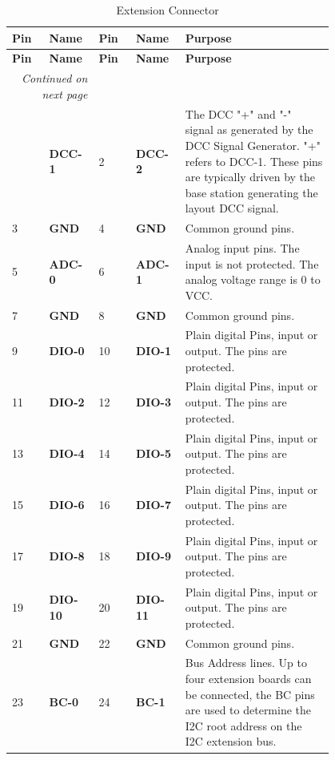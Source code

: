 \begin{longtable}{@{}|p{0.1\linewidth}|p{0.1\linewidth}|p{0.1\linewidth}|p{0.1\linewidth}|p{0.4\linewidth}|@{}}
    \caption{Extension Connector} \\
    \toprule
    \textbf{Pin} & \textbf{Name} & \textbf{Pin} & \textbf{Name} & \textbf{Purpose} \\
    \midrule
    \endfirsthead
    \toprule
    \textbf{Pin} & \textbf{Name} & \textbf{Pin} & \textbf{Name} & \textbf{Purpose} \\
    \midrule
    \endhead
    \midrule
    \multicolumn{2}{r}{\textit{Continued on next page}} \\
    \midrule
    \endfoot
    \bottomrule
    \endlastfoot
    1 & \textbf{DCC-1} & 2 & \textbf{DCC-2} & The DCC "+" and "-" signal as generated by the DCC Signal Generator. "+" refers to DCC-1. These pins are typically driven by the base station generating the layout DCC signal.\\
    \midrule
    3 & \textbf{GND} & 4 & \textbf{GND} & Common ground pins. \\
    \midrule
    5 & \textbf{ADC-0} & 6 & \textbf{ADC-1} & Analog input pins. The input is not protected. The analog voltage range is 0 to VCC. \\
    \midrule
    7 & \textbf{GND} & 8 & \textbf{GND} & Common ground pins. \\
    \midrule
    9 & \textbf{DIO-0} & 10 & \textbf{DIO-1} & Plain digital Pins, input or output. The pins are protected. \\
    \midrule
    11 & \textbf{DIO-2} & 12 & \textbf{DIO-3} & Plain digital Pins, input or output. The pins are protected. \\
    \midrule
    13 & \textbf{DIO-4} & 14 & \textbf{DIO-5} & Plain digital Pins, input or output. The pins are protected. \\
    \midrule
    15 & \textbf{DIO-6} & 16 & \textbf{DIO-7} & Plain digital Pins, input or output. The pins are protected. \\
    \midrule
    17 & \textbf{DIO-8} & 18 & \textbf{DIO-9} & Plain digital Pins, input or output. The pins are protected. \\
    \midrule
    19 & \textbf{DIO-10} & 20 & \textbf{DIO-11} & Plain digital Pins, input or output. The pins are protected. \\
    \midrule
    21 & \textbf{GND} & 22 & \textbf{GND} & Common ground pins. \\
    \midrule
    23 & \textbf{BC-0} & 24 & \textbf{BC-1} & Bus Address lines. Up to four extension boards can be connected, the BC pins are used to determine the I2C root address on the I2C extension bus. \\ 

\end{longtable}
